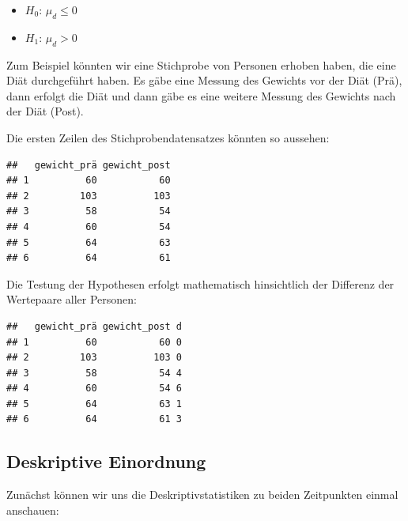 \documentclass[
]{book}
\newenvironment{Shaded}{\begin{snugshade}}{\end{snugshade}}
\newcommand{\FunctionTok}[1]{\textcolor[rgb]{0.13,0.29,0.53}{\textbf{#1}}}
\newcommand{\NormalTok}[1]{#1}
\newcommand{\OtherTok}[1]{\textcolor[rgb]{0.56,0.35,0.01}{#1}}
\newcommand{\SpecialCharTok}[1]{\textcolor[rgb]{0.81,0.36,0.00}{\textbf{#1}}}
\providecommand{\tightlist}{%
  \setlength{\itemsep}{0pt}\setlength{\parskip}{0pt}}
\begin{document}
\begin{itemize}
\tightlist
\item
  \(H_0\): \(μ_d \leq 0\)
\item
  \(H_1\): \(μ_d > 0\)
\end{itemize}

Zum Beispiel könnten wir eine Stichprobe von Personen erhoben haben, die eine Diät durchgeführt haben. Es gäbe eine Messung des Gewichts vor der Diät (Prä), dann erfolgt die Diät und dann gäbe es eine weitere Messung des Gewichts nach der Diät (Post).

Die ersten Zeilen des Stichprobendatensatzes könnten so aussehen:

\begin{verbatim}
##   gewicht_prä gewicht_post
## 1          60           60
## 2         103          103
## 3          58           54
## 4          60           54
## 5          64           63
## 6          64           61
\end{verbatim}

Die Testung der Hypothesen erfolgt mathematisch hinsichtlich der Differenz der Wertepaare aller Personen:

\begin{Shaded}
\end{Shaded}

\begin{verbatim}
##   gewicht_prä gewicht_post d
## 1          60           60 0
## 2         103          103 0
## 3          58           54 4
## 4          60           54 6
## 5          64           63 1
## 6          64           61 3
\end{verbatim}

\subsection{Deskriptive Einordnung}\label{deskriptive-einordnung-2}

Zunächst können wir uns die Deskriptivstatistiken zu beiden Zeitpunkten einmal anschauen:

\begin{Shaded}
\end{Shaded}
\end{document}
